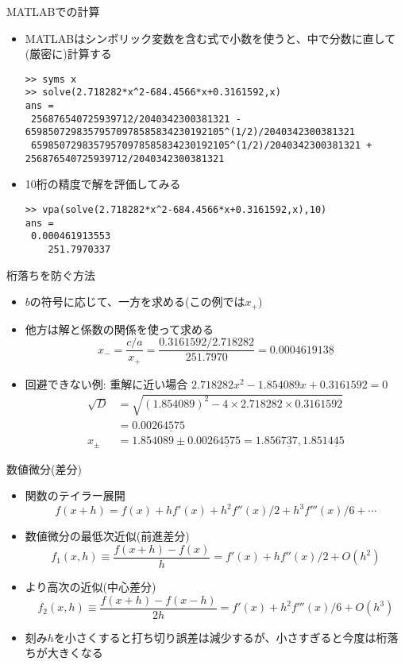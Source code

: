 \begin{frame}[t,fragile]{MATLABでの計算}
  \begin{itemize}
    \setlength{\itemsep}{1em}
  \item MATLABはシンボリック変数を含む式で小数を使うと、中で分数に直して(厳密に)計算する
    \begin{lstlisting}
>> syms x
>> solve(2.718282*x^2-684.4566*x+0.3161592,x)
ans =
 256876540725939712/2040342300381321 - 65985072983579570978585834230192105^(1/2)/2040342300381321
 65985072983579570978585834230192105^(1/2)/2040342300381321 + 256876540725939712/2040342300381321
    \end{lstlisting}
    \item 10桁の精度で解を評価してみる
    \begin{lstlisting}
>> vpa(solve(2.718282*x^2-684.4566*x+0.3161592,x),10)
ans =
 0.000461913553
    251.7970337
    \end{lstlisting}
  \end{itemize}
\end{frame}

\begin{frame}[t,fragile]{桁落ちを防ぐ方法}
  \begin{itemize}
    \setlength{\itemsep}{1em}
  \item $b$の符号に応じて、一方を求める(この例では$x_+$)
  \item 他方は解と係数の関係を使って求める
    \[
    x_- = \frac{c/a}{x_+} = \frac{0.3161592 / 2.718282}{251.7970} = 0.000461913\underline{8}
    \]
  \item 回避できない例: 重解に近い場合 $2.718282x^2 - 1.854089x + 0.3161592=0$
    \begin{align*}
      \sqrt{D} &= \sqrt{(1.854089)^2 - 4 \times 2.718282 \times 0.3161592} \\ &= 0.002\underline{64575} \\
      x_\pm &= 1.854089 \pm 0.002\underline{64575} = 1.856\underline{737}, 1.851\underline{445}
    \end{align*}
  \end{itemize}
\end{frame}

\begin{frame}[t,fragile]{数値微分(差分)}
  \begin{itemize}
    \setlength{\itemsep}{1em}
  \item 関数のテイラー展開
    \[
    f(x+h) = f(x) + h f'(x) + h^2 f''(x)/2 + h^3 f'''(x)/6 + \cdots
    \]
  \item 数値微分の最低次近似(前進差分)
    \[
    f_1(x,h) \equiv \frac{f(x+h)-f(x)}{h} = f'(x) + h f''(x)/2 + O(h^2)
    \]
  \item より高次の近似(中心差分)
    \[
    f_2(x,h) \equiv \frac{f(x+h)-f(x-h)}{2h} = f'(x) + h^2 f'''(x)/6 + O(h^3)
    \]
  \item 刻み$h$を小さくすると打ち切り誤差は減少するが、小さすぎると今度は桁落ちが大きくなる
  \end{itemize}
\end{frame}

